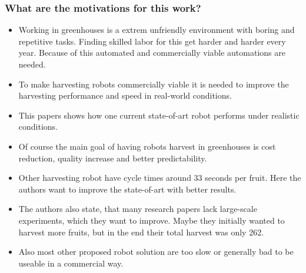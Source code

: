     
     
    \subsubsection*{What are the motivations for this work?}
    \begin{itemize}
        \item Working in greenhouses is a extrem unfriendly environment with boring and repetitive tasks. Finding skilled
        labor for this get harder and harder every year. Because of this automated and commercially viable automations are needed.
        \item To make harvesting robots commercially viable it is needed to improve the harvesting performance and speed in real-world conditions.
        \item This papers shows how one current state-of-art robot performs under realistic conditions.
        \item Of course the main goal of having robots harvest in greenhouses is cost reduction, quality increase and 
        better predictability.
        \item Other harvesting robot have cycle times around 33 seconds per fruit. Here the authors want to improve the state-of-art with better results.
        \item The authors also state, that many research papers lack large-scale experiments, which they want to improve. 
        Maybe they initially wanted to harvest more fruits, but in the end their total harvest was only 262.
        \item Also most other proposed robot solution are too slow or generally bad to be useable in a commercial way.
    \end{itemize}
